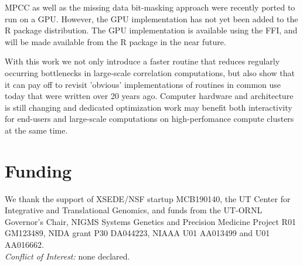 \documentclass{bioinfo}
\begin{document}
MPCC as well as the missing data bit-masking approach were recently ported 
to run on a GPU. However, the GPU implementation has not yet been added to 
the R package distribution. The GPU implementation is available using the FFI, and 
will be made available from the R package in the near future.

With this work we not only introduce a faster routine that reduces
regularly occurring bottlenecks in large-scale correlation computations, but
also show that it can pay off to revisit 'obvious' implementations
of routines in common use today that were written over 20 years
ago. Computer hardware and architecture is still changing and
dedicated optimization work may benefit both interactivity for
end-users and large-scale computations on high-perfomance compute
clusters at the same time.

\section*{Funding}

We thank the support of XSEDE/NSF startup MCB190140, the UT Center for
Integrative and Translational Genomics, and funds from the UT-ORNL
Governor's Chair, NIGMS Systems Genetics and Precision Medicine
Project R01 GM123489, NIDA grant P30 DA044223, NIAAA U01 AA013499 and
U01 AA016662.\\
\textit{Conflict of Interest:} none declared.

\vspace*{-5mm}


\end{document}
